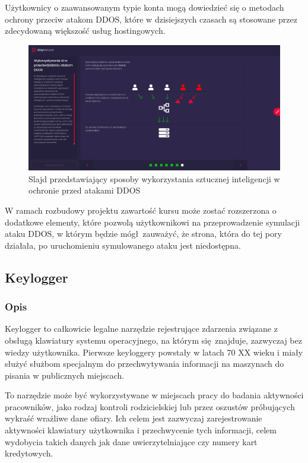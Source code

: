 \documentclass[12pt,twoside]{article}
\begin{document}
Użytkownicy o zaawansowanym typie konta mogą dowiedzieć się o metodach ochrony przeciw atakom DDOS, które w dzisiejszych czasach są stosowane przez zdecydowaną większość usług hostingowych. 

\begin{figure}[H]
	\centering
	\includegraphics[width=1\linewidth]{figures/dos-slide-screenshot3}
	\caption{Slajd przedstawiający sposoby wykorzystania sztucznej inteligencji w ochronie przed atakami DDOS}
\end{figure}


W ramach rozbudowy projektu zawartość kursu może zostać rozszerzona o dodatkowe elementy, które pozwolą użytkownikowi na przeprowadzenie symulacji ataku DDOS, w którym będzie mógł zauważyć, że strona, która do tej pory działała, po uruchomieniu symulowanego ataku jest niedostępna.
 
\clearpage


\subsection{Keylogger}
\subsubsection{Opis}
Keylogger to całkowicie legalne narzędzie rejestrujące zdarzenia związane z obsługą klawiatury systemu operacyjnego, na którym się znajduje, zazwyczaj bez wiedzy użytkownika. Pierwsze keyloggery powstały w latach 70 XX wieku i miały służyć służbom specjalnym do przechwytywania informacji na maszynach do pisania w publicznych miejscach.

To narzędzie może być wykorzystywane w miejscach pracy do badania aktywności pracowników, jako rodzaj kontroli rodzicielskiej lub przez oszustów próbujących wykraść wrażliwe dane ofiary. Ich celem jest zazwyczaj zarejestrowanie aktywności klawiatury użytkownika i przechwycenie tych informacji, celem wydobycia takich danych jak dane uwierzytelniające czy numery kart kredytowych.
\end{document}
